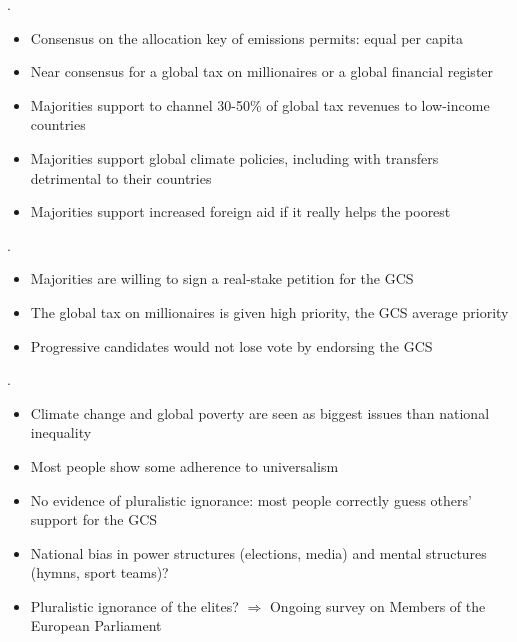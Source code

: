 \documentclass[aspectratio=169,xcolor=dvipsnames, 11pt,mathserif]{beamer}
\begin{document}
\begin{framefont}{\small}
\begin{frame}{} %
\begin{itemize}
.  
	\begin{itemize}
		\item Consensus on the allocation key of emissions permits: equal per capita
        \item Near consensus for a global tax on millionaires or a global financial register
		\item Majorities support to channel 30-50\% of global tax revenues to low-income countries
		\item Majorities support global climate policies, including with transfers detrimental to their countries
		\item Majorities support increased foreign aid if it really helps the poorest
    \end{itemize}
\pause
{}.  
	\begin{itemize}
		\item Majorities are willing to sign a real-stake petition for the GCS
		\item The global tax on millionaires is given high priority, the GCS average priority
		\item Progressive candidates would not lose vote by endorsing the GCS
	\end{itemize}
\pause
{}.  \textit{}
	\begin{itemize}
		\item Climate change and global poverty are seen as biggest issues than national inequality
		\item Most people show some adherence to universalism
		\item No evidence of pluralistic ignorance: most people correctly guess others' support for the GCS
	\end{itemize} \pause
\ip {}
    \begin{itemize}
        \item National bias in power structures (elections, media) and mental structures (hymns, sport teams)? %
        \item Pluralistic ignorance of the elites? $\Rightarrow$ Ongoing survey on Members of the European Parliament 

\end{itemize}
\end{itemize}
\end{frame}
\end{framefont}
\end{document}
